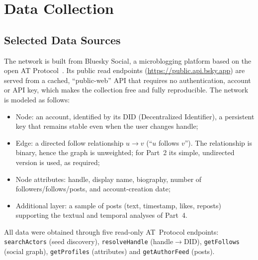 \section{Data Collection}
\label{sec:data}

\subsection{Selected Data Sources}
The network is built from Bluesky Social, a microblogging platform based on the open AT Protocol~\cite{atproto}. Its public read endpoints (\url{https://public.api.bsky.app}) are served from a cached, ``public-web'' API that requires no authentication, account or API key, which makes the collection free and fully reproducible. The network is modeled as follows:
\begin{itemize}\itemsep0pt
  \item Node: an account, identified by its DID (Decentralized Identifier), a persistent key that remains stable even when the user changes handle;
  \item Edge: a directed follow relationship $u\!\to\!v$ (``$u$ follows $v$''). The relationship is binary, hence the graph is unweighted; for Part~2 its simple, undirected version is used, as required;
  \item Node attributes: handle, display name, biography, number of followers/follows/posts, and account-creation date;
  \item Additional layer: a sample of posts (text, timestamp, likes, reposts) supporting the textual and temporal analyses of Part~4.
\end{itemize}
All data were obtained through five read-only AT~Protocol endpoints: \texttt{searchActors} (seed discovery), \texttt{resolveHandle} (handle$\to$DID), \texttt{getFollows} (social graph), \texttt{getProfiles} (attributes) and \texttt{getAuthorFeed} (posts).

